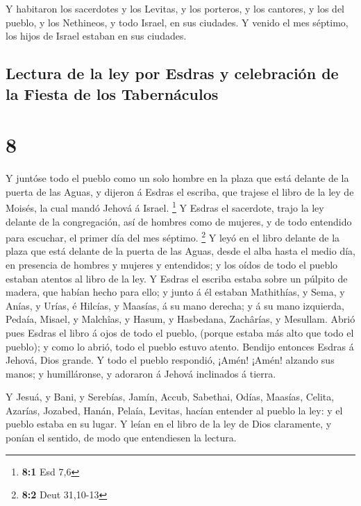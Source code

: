  Y habitaron los sacerdotes y los Levitas, y los porteros,
y los cantores, y los del pueblo, y los Nethineos, y todo Israel, en sus
ciudades. Y venido el mes séptimo, los hijos de Israel estaban en sus
ciudades.

\hypertarget{lectura-de-la-ley-por-esdras-y-celebraciuxf3n-de-la-fiesta-de-los-tabernuxe1culos}{%
\subsection{Lectura de la ley por Esdras y celebración de la Fiesta de
los
Tabernáculos}\label{lectura-de-la-ley-por-esdras-y-celebraciuxf3n-de-la-fiesta-de-los-tabernuxe1culos}}

\hypertarget{section-7}{%
\section{8}\label{section-7}}

 Y juntóse todo el pueblo como un solo hombre en la plaza
que está delante de la puerta de las Aguas, y dijeron á Esdras el
escriba, que trajese el libro de la ley de Moisés, la cual mandó Jehová
á Israel. \footnote{\textbf{8:1} Esd 7,6}  Y Esdras el
sacerdote, trajo la ley delante de la congregación, así de hombres como
de mujeres, y de todo entendido para escuchar, el primer día del mes
séptimo. \footnote{\textbf{8:2} Deut 31,10-13}  Y leyó en el
libro delante de la plaza que está delante de la puerta de las Aguas,
desde el alba hasta el medio día, en presencia de hombres y mujeres y
entendidos; y los oídos de todo el pueblo estaban atentos al libro de la
ley.  Y Esdras el escriba estaba sobre un púlpito de madera,
que habían hecho para ello; y junto á él estaban Mathithías, y Sema, y
Anías, y Urías, é Hilcías, y Maasías, á su mano derecha; y á su mano
izquierda, Pedaía, Misael, y Malchîas, y Hasum, y Hasbedana, Zachârías,
y Mesullam.  Abrió pues Esdras el libro á ojos de todo el
pueblo, (porque estaba más alto que todo el pueblo); y como lo abrió,
todo el pueblo estuvo atento.  Bendijo entonces Esdras á
Jehová, Dios grande. Y todo el pueblo respondió, ¡Amén! ¡Amén! alzando
sus manos; y humilláronse, y adoraron á Jehová inclinados á tierra.

 Y Jesuá, y Bani, y Serebías, Jamín, Accub, Sabethai, Odías,
Maasías, Celita, Azarías, Jozabed, Hanán, Pelaía, Levitas, hacían
entender al pueblo la ley: y el pueblo estaba en su lugar. 
Y leían en el libro de la ley de Dios claramente, y ponían el sentido,
de modo que entendiesen la lectura.

